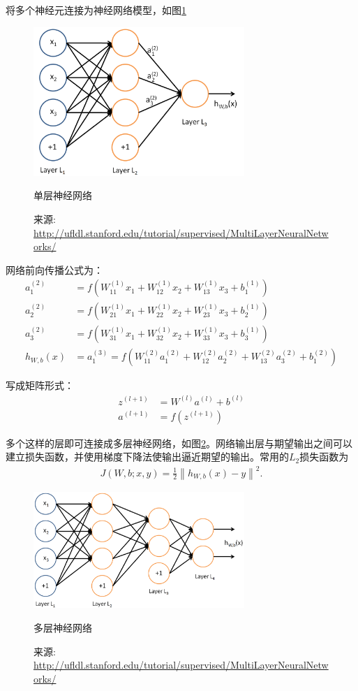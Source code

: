将多个神经元连接为神经网络模型，如图\ref{fig:n331}
\begin{figure}[htbp]
\centering
\includegraphics[width=8cm]{resource/Network331.png}
\caption{单层神经网络}
\caption*{\small 来源: \url{http://ufldl.stanford.edu/tutorial/supervised/MultiLayerNeuralNetworks/}}
\label{fig:n331}
\end{figure}

网络前向传播公式为：
\begin{align}
a_1^{(2)} &= f(W_{11}^{(1)}x_1 + W_{12}^{(1)} x_2 + W_{13}^{(1)} x_3 + b_1^{(1)})  \\
a_2^{(2)} &= f(W_{21}^{(1)}x_1 + W_{22}^{(1)} x_2 + W_{23}^{(1)} x_3 + b_2^{(1)})  \\
a_3^{(2)} &= f(W_{31}^{(1)}x_1 + W_{32}^{(1)} x_2 + W_{33}^{(1)} x_3 + b_3^{(1)})  \\
h_{W,b}(x) &= a_1^{(3)} =  f(W_{11}^{(2)}a_1^{(2)} + W_{12}^{(2)} a_2^{(2)} + W_{13}^{(2)} a_3^{(2)} + b_1^{(2)})
\end{align}

写成矩阵形式：
\begin{align}
z^{(l+1)} &= W^{(l)} a^{(l)} + b^{(l)}   \\
a^{(l+1)} &= f(z^{(l+1)})
\end{align}

多个这样的层即可连接成多层神经网络，如图\ref{fig:n3322}。网络输出层与期望输出之间可以建立损失函数，并使用梯度下降法使输出逼近期望的输出。常用的$L_2$损失函数为
\begin{align}
J(W,b; x,y) = \frac{1}{2} \left\| h_{W,b}(x) - y \right\|^2.
\end{align}

\begin{figure}[htbp]
\centering
\includegraphics[width=8cm]{resource/Network3322.png}
\caption{多层神经网络}
\caption*{\small 来源: \url{http://ufldl.stanford.edu/tutorial/supervised/MultiLayerNeuralNetworks/}}
\label{fig:n3322}
\end{figure}

